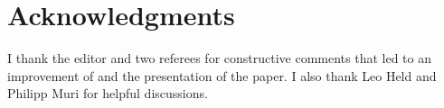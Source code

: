 \documentclass[nojss]{jss}\usepackage[]{graphicx}\usepackage[]{color}
\begin{document}
\section{Acknowledgments} \label{sec: acknow}
I thank the editor and two referees for constructive comments that led to an improvement of  and the presentation of 
the paper. I also thank Leo Held and Philipp Muri for helpful discussions.



\end{document}
